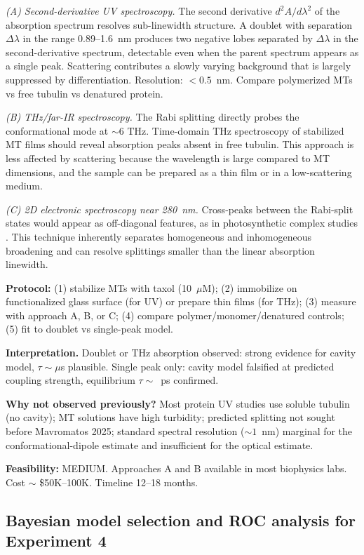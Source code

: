 \documentclass[twocolumn,10pt]{article}
\newcommand{\THz}{\text{~THz}}
\begin{document}
\textit{(A) Second-derivative UV spectroscopy.} The second derivative
$d^2A/d\lambda^2$ of the absorption spectrum resolves sub-linewidth
structure. A doublet with separation $\Delta\lambda$ in the range
0.89--1.6~nm produces two negative lobes separated by $\Delta\lambda$ in
the second-derivative spectrum, detectable even when the parent spectrum
appears as a single peak. Scattering contributes a slowly varying
background that is largely suppressed by differentiation. Resolution:
$< 0.5$~nm. Compare polymerized MTs vs free tubulin vs denatured protein.

\textit{(B) THz/far-IR spectroscopy.} The Rabi splitting directly probes
the conformational mode at $\sim 6\THz$. Time-domain THz spectroscopy of
stabilized MT films should reveal absorption peaks absent in free
tubulin. This approach is less affected by scattering because the
wavelength is large compared to MT dimensions, and the sample can be
prepared as a thin film or in a low-scattering medium.

\textit{(C) 2D electronic spectroscopy near 280~nm.} Cross-peaks between
the Rabi-split states would appear as off-diagonal features, as in
photosynthetic complex studies \cite{Thyrhaug2018}. This technique
inherently separates homogeneous and inhomogeneous broadening and can
resolve splittings smaller than the linear absorption linewidth.

\textbf{Protocol:} (1) stabilize MTs with taxol (10~$\mu$M); (2) immobilize
on functionalized glass surface (for UV) or prepare thin films (for THz);
(3) measure with approach A, B, or C; (4) compare polymer/monomer/denatured
controls; (5) fit to doublet vs single-peak model.

\textbf{Interpretation.} Doublet or THz absorption observed: strong
evidence for cavity model, $\tau \sim \mu$s plausible. Single peak only:
cavity model falsified at predicted coupling strength, equilibrium
$\tau \sim$~ps confirmed.

\textbf{Why not observed previously?} Most protein UV studies use soluble
tubulin (no cavity); MT solutions have high turbidity; predicted splitting
not sought before Mavromatos 2025; standard spectral resolution
($\sim 1$~nm) marginal for the conformational-dipole estimate and
insufficient for the optical estimate.

\textbf{Feasibility:} MEDIUM. Approaches A and B available in most
biophysics labs. Cost $\sim$ \$50K--100K. Timeline 12--18 months.


\subsection{Bayesian model selection and ROC analysis for Experiment 4}
\label{sec:bic_roc}
\end{document}

